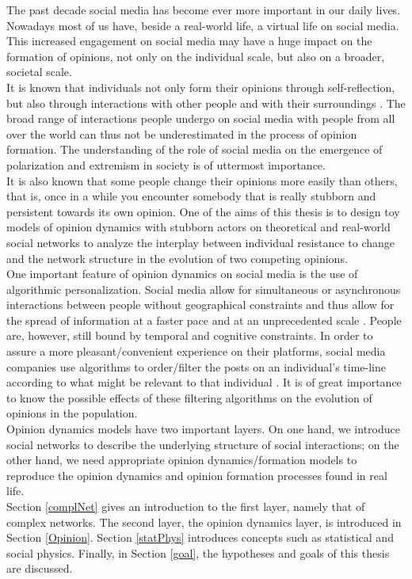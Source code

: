 \documentclass[11 pt , letterpaper , twoside , openright]{book}
\begin{document}

The past decade social media has become ever more important in our daily lives. Nowadays most of us have, beside a real-world life, a virtual life on social media. This increased engagement on social media may have a huge impact on the formation of opinions, not only on the individual scale, but also on a broader, societal scale. \\
It is known that individuals not only form their opinions through self-reflection, but also through interactions with other people and with their surroundings \cite{Perra2019}. The broad range of interactions people undergo on social media with people from all over the world can thus not be underestimated in the process of opinion formation. The understanding of the role of social media on the emergence of polarization and extremism in society is of uttermost importance.\\
\newline
It is also known that some people change their opinions more easily than others, that is, once in a while you encounter somebody that is really stubborn and persistent towards its own opinion. One of the aims of this thesis is to design toy models of opinion dynamics with stubborn actors on theoretical and real-world social networks to analyze the interplay between individual resistance to change and the network structure in the evolution of two competing opinions.\\
\newline
One important feature of opinion dynamics on social media is the use of algorithmic personalization. Social media allow for simultaneous or asynchronous interactions between people without geographical constraints and thus allow for the spread of information at a faster pace and at an unprecedented scale \cite{Perra2019}. People are, however, still bound by temporal and cognitive constraints. In order to assure a more pleasant/convenient experience on their platforms, social media companies use algorithms to order/filter the posts on an individual's time-line according to what might be relevant to that individual \cite{Perra2019}. It is of great importance to know the possible effects of these filtering algorithms on the evolution of opinions in the population.\\  
\newline
Opinion dynamics models have two important layers. On one hand, we introduce social networks to describe the underlying structure of social interactions; on the other hand, we need appropriate opinion dynamics/formation models to reproduce the opinion dynamics and opinion formation processes found in real life.\\
\newline
Section \ref{complNet} gives an introduction to the first layer, namely that of complex networks. The second layer, the opinion dynamics layer, is introduced in Section \ref{Opinion}. Section \ref{statPhys} introduces concepts such as statistical and social physics. Finally, in Section \ref{goal}, the hypotheses and goals of this thesis are discussed.
\end{document}
